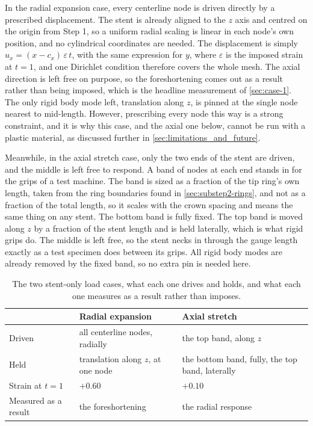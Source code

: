 In the radial expansion case, every centerline node is driven directly by a prescribed displacement. The stent is already aligned to the $z$ axis and centred on the origin from Step 1, so a uniform radial scaling is linear in each node's own position, and no cylindrical coordinates are needed. The displacement is simply $u_x = (x - c_x)\,\varepsilon\, t$, with the same expression for $y$, where $\varepsilon$ is the imposed strain at $t = 1$, and one Dirichlet condition therefore covers the whole mesh. The axial direction is left free on purpose, so the foreshortening comes out as a result rather than being imposed, which is the headline measurement of \cref{sec:case-1}. The only rigid body mode left, translation along $z$, is pinned at the single node nearest to mid-length. However, prescribing every node this way is a strong constraint, and it is why this case, and the axial one below, cannot be run with a plastic material, as discussed further in \cref{sec:limitations_and_future}.

Meanwhile, in the axial stretch case, only the two ends of the stent are driven, and the middle is left free to respond. A band of nodes at each end stands in for the grips of a test machine. The band is sized as a fraction of the tip ring's own length, taken from the ring boundaries found in \cref{sec:substep2-rings}, and not as a fraction of the total length, so it scales with the crown spacing and means the same thing on any stent. The bottom band is fully fixed. The top band is moved along $z$ by a fraction of the stent length and is held laterally, which is what rigid grips do. The middle is left free, so the stent necks in through the gauge length exactly as a test specimen does between its grips. All rigid body modes are already removed by the fixed band, so no extra pin is needed here.

\begin{table}[htb]
  \centering
  \begin{tabular}{@{}>{\raggedright\arraybackslash}m{}>{\raggedright\arraybackslash}m{}>{\raggedright\arraybackslash}m{}@{}}
    \toprule
     & \textbf{Radial expansion} & \textbf{Axial stretch} \\
    \midrule
    Driven & all centerline nodes, radially & the top band, along $z$ \\
    \midrule
    Held & translation along $z$, at one node & the bottom band, fully, the top band, laterally \\
    \midrule
    Strain at $t = 1$ & $+0.60$ & $+0.10$ \\
    \midrule
    Measured as a result & the foreshortening & the radial response \\
    \bottomrule
  \end{tabular}
  \caption{The two stent-only load cases, what each one drives and holds, and what each one measures as a result rather than imposes.}
  \label{tab:stent-only-cases}
\end{table}

